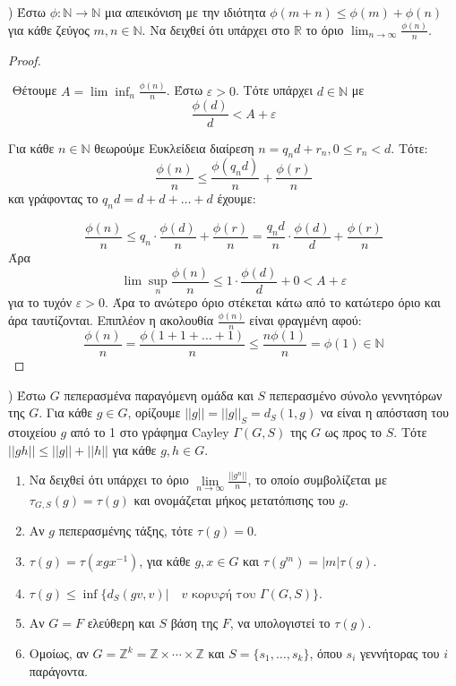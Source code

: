 \documentclass[oneside,a4paper]{article}
\newcommand {\tl}{\textlatin}
\newcommand{\Z}{\mathbb{Z}}
\begin{document}
\pagebreak

) Έστω $\phi : \mathbb{N} \rightarrow \mathbb{N}$ μια απεικόνιση με την ιδιότητα $\phi(m+n) \leq \phi(m) + \phi(n)$ για κάθε ζεύγος $m,n \in \mathbb{N}$. Να δειχθεί ότι υπάρχει στο $\mathbb{R}$ το όριο $\lim_{n\rightarrow \infty} \frac{\phi(n)}{n}$.

\begin{proof} $ $


	$ $\newline
	Θέτουμε $A = \lim \inf_n \frac{\phi(n)}{n}$. Έστω $\varepsilon >0$. Τότε υπάρχει $d \in \mathbb{N}$ με 
	$$\frac{\phi(d)}{d} < A + \varepsilon$$


	\noindent Για κάθε $n \in \mathbb{N}$ θεωρούμε Ευκλείδεια διαίρεση $n = q_n d + r_n, 0\leq r_n < d$. Τότε:
	$$\frac{\phi(n)}{n} \leq \frac{\phi(q_n d)}{n} + \frac{\phi(r)}{n} $$ και γράφοντας το $q_n d = d + d + \ldots + d$ έχουμε:

	$$\frac{\phi(n)}{n} \leq q_n \cdot \frac{\phi(d)}{n} + \frac{\phi(r)}{n} = \frac{q_n d}{n} \cdot \frac{\phi(d)}{d}  + \frac{\phi(r)}{n}$$ Άρα $$\lim\sup_n \frac{\phi(n)}{n} \leq 1 \cdot \frac{\phi(d)}{d} + 0 < A + \varepsilon$$ για το τυχόν $\varepsilon >0$. Άρα το ανώτερο όριο στέκεται κάτω από το κατώτερο όριο και άρα ταυτίζονται. Επιπλέον η ακολουθία $\frac{\phi(n)}{n}$ είναι φραγμένη αφού:
	$$\frac{\phi(n)}{n} = \frac{\phi(1 + 1 + \ldots + 1)}{n} \leq \frac{n \phi(1)}{n} = \phi(1) \in \mathbb{N}$$
\end{proof}


\pagebreak


) Έστω $G$ πεπερασμένα παραγόμενη ομάδα και $S$ πεπερασμένο σύνολο γεννητόρων της $G$. Για κάθε $g \in G$, ορίζουμε $||g|| = ||g||_S = d_S (1,g)$ να είναι η απόσταση του στοιχείου $g$ από το 1 στο γράφημα \tl{Cayley} $\Gamma(G,S)$ της $G$ ως προς το $S$. Τότε $||gh|| \leq ||g|| + ||h||$ για κάθε $g,h \in G$.
\begin{enumerate}
	\item Να δειχθεί ότι υπάρχει το όριο $\lim\limits_{n\rightarrow \infty} \frac{||g^n||}{n}$, το οποίο συμβολίζεται με $\tau_{G,S}(g) = \tau(g)$ και ονομάζεται μήκος μετατόπισης του $g$.
	\item Αν $g$ πεπερασμένης τάξης, τότε $\tau(g) = 0$.
	\item $\tau(g) = \tau(xgx^{-1})$, για κάθε $g,x \in G$ και $\tau(g^m) = |m| \tau(g)$.
	\item $\tau(g) \leq \inf \{ d_S(gv,v)| \quad v \text{ κορυφή του } \Gamma(G,S)\}$.
	\item Αν $G=F$ ελεύθερη και $S$ βάση της $F$, να υπολογιστεί το $\tau(g)$.
	\item Ομοίως, αν $G = \mathbb{Z}^k = \Z \times \cdots \times \Z$ και $S = \{s_1,\ldots,s_k\}$, όπου $s_i$ γεννήτορας του $i$ παράγοντα.
	
\end{enumerate}
\end{document}
